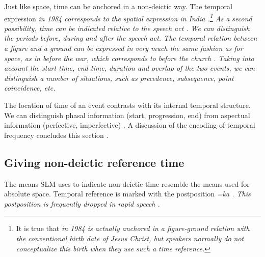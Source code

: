 Just like space, time can be anchored in a non-deictic way. The temporal expression \em in 1984 \em corresponds to the spatial expression \em in India \em {}.\footnote{It is true that \em in 1984 \em is actually anchored in a figure-ground relation with the conventional  birth date of Jesus Christ, but speakers normally do not conceptualize this birth when they use such a time reference.}
As a second possibility, time can be indicated relative to the speech act . We can distinguish the periods before, during and after the speech act.
The temporal relation between a figure and a ground can be expressed in very much the same fashion as for space, as in \em before the war\em, which corresponds to \em before the church \em {}.  Taking into account the start time, end time, duration and overlap of the two events, we can distinguish a number of situations, such as precedence, subsequence, point coincidence, etc.

The location of time of an event contrasts with its internal temporal structure. We can distinguish phasal information (start, progression, end)  from aspectual information (perfective, imperfective) . A discussion of the encoding of temporal frequency concludes this section .



\subsection[Non-deictic reference time]{Giving non-deictic reference time}\label{sec:func:Givingnon-deicticreferencetime}
The means SLM uses to indicate non-deictic time resemble the means used for absolute space. Temporal reference is marked with the postposition \em=ka \em {}. This postposition is frequently dropped in rapid speech .



